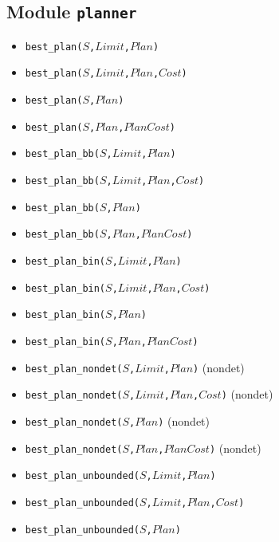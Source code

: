 \documentclass[10pt]{article}
\begin{document}
\begin{multicols}{2}
\section*{Module \texttt{planner}}  
\begin{scriptsize}
\begin{itemize}
\item \texttt{best\_plan($S$,$Limit$,$Plan$)}
\item \texttt{best\_plan($S$,$Limit$,$Plan$,$Cost$)}
\item \texttt{best\_plan($S$,$Plan$)}
\item \texttt{best\_plan($S$,$Plan$,$PlanCost$)}
\item \texttt{best\_plan\_bb($S$,$Limit$,$Plan$)}
\item \texttt{best\_plan\_bb($S$,$Limit$,$Plan$,$Cost$)}
\item \texttt{best\_plan\_bb($S$,$Plan$)}
\item \texttt{best\_plan\_bb($S$,$Plan$,$PlanCost$)}
\item \texttt{best\_plan\_bin($S$,$Limit$,$Plan$)}
\item \texttt{best\_plan\_bin($S$,$Limit$,$Plan$,$Cost$)}
\item \texttt{best\_plan\_bin($S$,$Plan$)}
\item \texttt{best\_plan\_bin($S$,$Plan$,$PlanCost$)}
\item \texttt{best\_plan\_nondet($S$,$Limit$,$Plan$)} (nondet)
\item \texttt{best\_plan\_nondet($S$,$Limit$,$Plan$,$Cost$)} (nondet)
\item \texttt{best\_plan\_nondet($S$,$Plan$)} (nondet)
\item \texttt{best\_plan\_nondet($S$,$Plan$,$PlanCost$)} (nondet)
\item \texttt{best\_plan\_unbounded($S$,$Limit$,$Plan$)}
\item \texttt{best\_plan\_unbounded($S$,$Limit$,$Plan$,$Cost$)}
\item \texttt{best\_plan\_unbounded($S$,$Plan$)}

\end{itemize}
\end{scriptsize}
\end{multicols}
\end{document}
